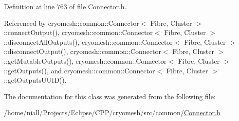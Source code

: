 \-Definition at line 763 of file \-Connector.\-h.



\-Referenced by cryomesh\-::common\-::\-Connector$<$ Fibre, Cluster $>$\-::connect\-Output(), cryomesh\-::common\-::\-Connector$<$ Fibre, Cluster $>$\-::disconnect\-All\-Outputs(), cryomesh\-::common\-::\-Connector$<$ Fibre, Cluster $>$\-::disconnect\-Output(), cryomesh\-::common\-::\-Connector$<$ Fibre, Cluster $>$\-::get\-Mutable\-Outputs(), cryomesh\-::common\-::\-Connector$<$ Fibre, Cluster $>$\-::get\-Outputs(), and cryomesh\-::common\-::\-Connector$<$ Fibre, Cluster $>$\-::get\-Outputs\-U\-U\-I\-D().



\-The documentation for this class was generated from the following file\-:\begin{DoxyCompactItemize}
\item 
/home/niall/\-Projects/\-Eclipse/\-C\-P\-P/cryomesh/src/common/\hyperlink{Connector_8h}{\-Connector.\-h}\end{DoxyCompactItemize}
